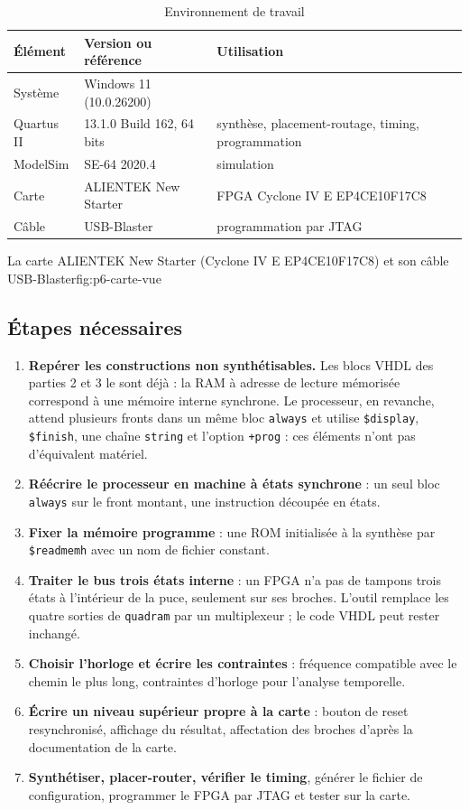 \begin{table}[H]
\centering
\begin{tabular}{lll}
\toprule
Élément & Version ou référence & Utilisation \\
\midrule
Système & Windows 11 (10.0.26200) & \\
Quartus II & 13.1.0 Build 162, 64 bits & synthèse, placement-routage, timing, programmation \\
ModelSim & SE-64 2020.4 & simulation \\
Carte & ALIENTEK New Starter & FPGA Cyclone IV E EP4CE10F17C8 \\
Câble & USB-Blaster & programmation par JTAG \\
\bottomrule
\end{tabular}
\caption{Environnement de travail}
\label{tab:environnement}
\end{table}

{La carte ALIENTEK New Starter (Cyclone IV E EP4CE10F17C8) et son câble USB-Blaster}{fig:p6-carte-vue}

\subsection{Étapes nécessaires}

\begin{enumerate}
\item \textbf{Repérer les constructions non synthétisables.} Les blocs VHDL des parties 2 et 3
le sont déjà : la RAM à adresse de lecture mémorisée correspond à une mémoire interne
synchrone. Le processeur, en revanche, attend plusieurs fronts dans un même bloc
\texttt{always} et utilise \texttt{\$display}, \texttt{\$finish}, une chaîne \texttt{string}
et l'option \texttt{+prog} : ces éléments n'ont pas d'équivalent matériel.
\item \textbf{Réécrire le processeur en machine à états synchrone} : un seul bloc
\texttt{always} sur le front montant, une instruction découpée en états.
\item \textbf{Fixer la mémoire programme} : une ROM initialisée à la synthèse par
\texttt{\$readmemh} avec un nom de fichier constant.
\item \textbf{Traiter le bus trois états interne} : un FPGA n'a pas de tampons trois états à
l'intérieur de la puce, seulement sur ses broches. L'outil remplace les quatre sorties de
\texttt{quadram} par un multiplexeur ; le code VHDL peut rester inchangé.
\item \textbf{Choisir l'horloge et écrire les contraintes} : fréquence compatible avec le
chemin le plus long, contraintes d'horloge pour l'analyse temporelle.
\item \textbf{Écrire un niveau supérieur propre à la carte} : bouton de reset resynchronisé,
affichage du résultat, affectation des broches d'après la documentation de la carte.
\item \textbf{Synthétiser, placer-router, vérifier le timing}, générer le fichier de
configuration, programmer le FPGA par JTAG et tester sur la carte.
\end{enumerate}

